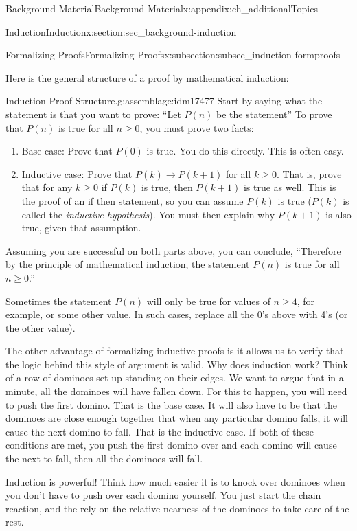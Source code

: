 \documentclass[oneside,10pt,]{book}
\numberwithin{equation}{chapter}
\def\imp{\rightarrow}
\begin{document}
\begin{appendixptx}{Background Material}{}{Background Material}{}{}{x:appendix:ch_additionalTopics}
\begin{sectionptx}{Induction}{}{Induction}{}{}{x:section:sec_background-induction}
\begin{subsectionptx}{Formalizing Proofs}{}{Formalizing Proofs}{}{}{x:subsection:subsec_induction-formproofs}
\par
Here is the general structure of a proof by mathematical induction:%
\begin{assemblage}{Induction Proof Structure.}{g:assemblage:idm17477}%
 Start by saying what the statement is that you want to prove: ``Let \(P(n)\) be the statement\textellipsis{}'' To prove that \(P(n)\) is true for all \(n \ge 0\), you must prove two facts:%
\begin{enumerate}
\item{}Base case: Prove that \(P(0)\) is true. You do this directly. This is often easy.%
\item{}Inductive case: Prove that \(P(k) \imp P(k+1)\) for all \(k \ge 0\). That is, prove that for any \(k \ge 0\) if \(P(k)\) is true, then \(P(k+1)\) is true as well. This is the proof of an if \textellipsis{} then \textellipsis{} statement, so you can assume \(P(k)\) is true (\(P(k)\) is called the \emph{inductive hypothesis}). You must then explain why \(P(k+1)\) is also true, given that assumption.%
\end{enumerate}
%
\par
Assuming you are successful on both parts above, you can conclude, ``Therefore by the principle of mathematical induction, the statement \(P(n)\) is true for all \(n \ge 0\).''%
\end{assemblage}
Sometimes the statement \(P(n)\) will only be true for values of \(n \ge 4\), for example, or some other value. In such cases, replace all the 0's above with 4's (or the other value).%
\par
The other advantage of formalizing inductive proofs is it allows us to verify that the logic behind this style of argument is valid. Why does induction work? Think of a row of dominoes set up standing on their edges. We want to argue that in a minute, all the dominoes will have fallen down. For this to happen, you will need to push the first domino. That is the base case. It will also have to be that the dominoes are close enough together that when any particular domino falls, it will cause the next domino to fall. That is the inductive case. If both of these conditions are met, you push the first domino over and each domino will cause the next to fall, then all the dominoes will fall.%
\par
Induction is powerful! Think how much easier it is to knock over dominoes when you don't have to push over each domino yourself. You just start the chain reaction, and the rely on the relative nearness of the dominoes to take care of the rest.%

\end{subsectionptx}
\end{sectionptx}
\end{appendixptx}
\end{document}
